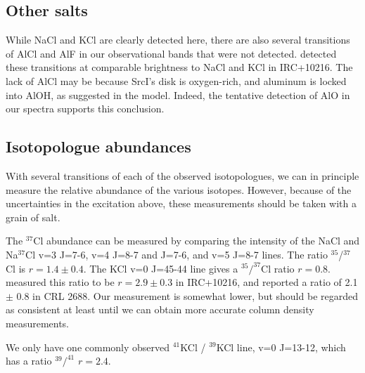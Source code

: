 \documentclass[12pt]{article}
\newcommand{\sourcei}{SrcI\xspace}
\begin{document}
\subsection*{Other salts}
While NaCl and KCl are clearly detected here, there are also several transitions of
AlCl and AlF in our observational bands that were not detected.
\cite{Cernicharo1987a} detected these transitions at comparable brightness to NaCl
and KCl in IRC+10216.  The lack of AlCl may be because \sourcei's disk is
oxygen-rich, and aluminum is locked into AlOH, as suggested in the
\cite{Cherchneff2012a} model.  Indeed, the tentative detection of AlO
in our spectra supports this conclusion.



\subsection*{Isotopologue abundances}
With several transitions of each of the observed isotopologues, we can in
principle measure the relative abundance of the various isotopes.  However,
because of the uncertainties in the excitation above, these measurements should
be taken with a grain of salt.

The $^{37}$Cl abundance can be measured by comparing the intensity of the NaCl
and Na$^{37}$Cl v=3 J=7-6, v=4 J=8-7 and J=7-6, and v=5 J=8-7 lines.  The ratio
$^{35}$/$^{37}$Cl is $r=1.4\pm0.4$.  The KCl v=0 J=45-44 line gives a
$^{35}/^{37}$Cl ratio $r=0.8$.  \cite{Agundez2012a} measured this ratio to be
$r=2.9\pm0.3$ in IRC+10216, and \cite{Highberger2003a} reported a ratio of 2.1
$\pm$ 0.8 in CRL 2688.  Our measurement is somewhat lower, but should be
regarded as consistent at least until we can obtain more accurate column
density measurements.


We only have one commonly observed $^{41}$KCl / $^{39}$KCl line, v=0 J=13-12,
which has a ratio $^{39}/^{41}$ $r=2.4$. 
\end{document}
